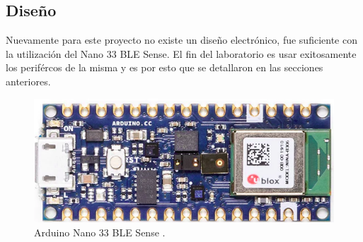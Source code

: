 \subsection{Diseño}
Nuevamente para este proyecto no existe un diseño electrónico, fue suficiente con la utilización del Nano 33 BLE Sense. El fin del laboratorio es usar exitosamente los perifércos de la misma y es por esto que se detallaron en las secciones anteriores.

\begin{figure}[H]
\centering
\includegraphics[scale=0.7]{./images/p.png} 
\caption{Arduino Nano 33 BLE Sense \cite{placa}.}
\label{f2}
\end{figure}
